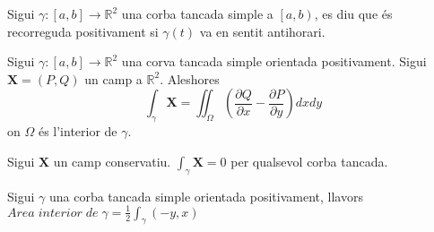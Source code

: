 \documentclass[../main.tex]{subfiles}
\begin{document}
    \begin{definicio}
        Sigui $\gamma: \left[a,b\right] \to \mathbb{R}^2$ una corba tancada simple a $\left[a, b\right)$, es diu que és
        recorreguda positivament si $\gamma\left(t\right)$ va en sentit antihorari.
    \end{definicio}
    \begin{teorema}
        Sigui $\gamma: \left[a,b\right] \to \mathbb{R}^2$ una corva tancada simple orientada
        positivament. Sigui $\mathbf{X} = \left(P, Q\right)$ un camp a $\mathbb{R}^2$. Aleshores
        $$
        \int_{\gamma} \mathbf{X} = \iint_\Omega \left(\frac{\partial Q}{\partial x}-\frac{\partial P}{\partial y}\right) dxdy 
        $$
        on $\Omega$ és l'interior de $\gamma$.
    \end{teorema}
    \begin{corolari}
        Sigui $\mathbf{X}$ un camp conservatiu. $\int_\gamma \mathbf{X} = 0$ per qualsevol corba
        tancada.
    \end{corolari}
    \begin{corolari}
        Sigui $\gamma$ una corba tancada simple orientada positivament, llavors
        $Area\;interior\;de\;\gamma = \frac{1}{2} \int_{\gamma}\left(-y,x\right)$
    \end{corolari}
\end{document}

